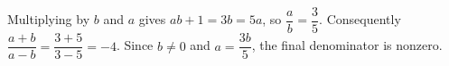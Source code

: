 Multiplying by $b$ and $a$ gives $ab+1=3b=5a$, so $\dfrac{a}{b}=\dfrac{3}{5}$. Consequently $\dfrac{a+b}{a-b}=\dfrac{3+5}{3-5}=\boxed{-4}$. Since $b\ne0$ and $a=\dfrac{3b}{5}$, the final denominator is nonzero.
